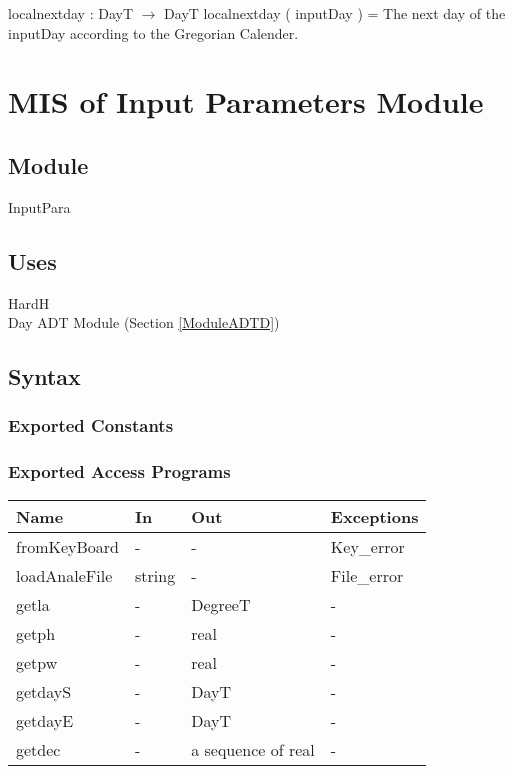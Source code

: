 \documentclass[12pt, titlepage]{article}
\begin{document}
localnextday : DayT $\rightarrow$ DayT
localnextday ( inputDay ) = The next day of the  inputDay according to the Gregorian Calender.

\newpage


\section{MIS of Input Parameters Module} \label{ModuleIP} 

\subsection{Module}
InputPara

\subsection{Uses}
HardH\\
Day ADT Module (Section \ref{ModuleADTD})

\subsection{Syntax}

\subsubsection{Exported Constants}


\subsubsection{Exported Access Programs}

\begin{center}
\begin{tabular}{p{4cm} p{2cm} p{4cm} p{2cm}}
\hline
\textbf{Name} & \textbf{In} & \textbf{Out} & \textbf{Exceptions} \\
\hline 
fromKeyBoard & - & - & Key\_error \\
loadAnaleFile & string & - & File\_error \\
getla & - & DegreeT & - \\
getph & - & real & - \\
getpw & - & real & - \\
getdayS & - & DayT & - \\
getdayE & - & DayT & - \\
getdec & - & a sequence of real & - \\


\hline
\end{tabular}
\end{center}
\end{document}

